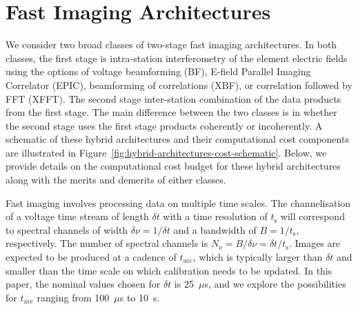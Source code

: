\documentclass[
  journal=pasa,
  manuscript=article-type,
  year=2020,
  volume=37,
]{cup-journal}
\begin{document}
\section{Fast Imaging Architectures} \label{sec:img-archs}


We consider two broad classes of two-stage fast imaging architectures. In both classes, the first stage is intra-station interferometry of the element electric fields using the options of voltage beamforming (BF), E-field Parallel Imaging Correlator (EPIC), beamforming of correlations (XBF), or correlation followed by FFT (XFFT). The second stage inter-station combination of the data products from the first stage. The main difference between the two classes is in whether the second stage uses the first stage products coherently or incoherently. A schematic of these hybrid architectures and their computational cost components are illustrated in Figure~\ref{fig:hybrid-architectures-cost-schematic}. Below, we provide details on the computational cost budget for these hybrid architectures along with the merits and demerits of either classes. 

Fast imaging involves processing data on multiple time scales. The channelisation of a voltage time stream of length $\delta t$ with a time resolution of $t_\textrm{s}$ will correspond to spectral channels of width $\delta\nu=1/\delta t$ and a bandwidth of $B=1/t_\textrm{s}$, respectively. The number of spectral channels is $N_\nu=B/\delta\nu=\delta t/t_\textrm{s}$. Images are expected to be produced at a cadence of $t_\textrm{acc}$, which is typically larger than $\delta t$ and smaller than the time scale on which calibration needs to be updated. In this paper, the nominal values chosen for $\delta t$ is 25~$\mu$s, and we explore the possibilities for $t_\textrm{acc}$ ranging from 100~$\mu$s to 10~s.  
\end{document}
